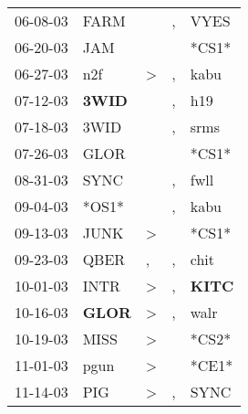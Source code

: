\begin{supertabular}{p{0.07\textwidth}p{0.06\textwidth}p{0.02\textwidth}p{0.02\textwidth}p{0.06\textwidth}}
          06-08-03\textsuperscript{} &           FARM\textsuperscript{} &                  &             , &           VYES\textsuperscript{} \\
          06-20-03\textsuperscript{} &            JAM\textsuperscript{} &                  &               &                            *CS1* \\
          06-27-03\textsuperscript{} &            n2f\textsuperscript{} &     \textgreater &             , &           kabu\textsuperscript{} \\
          07-12-03\textsuperscript{} &  \textbf{3WID\textsuperscript{}} &                  &             , &            h19\textsuperscript{} \\
          07-18-03\textsuperscript{} &           3WID\textsuperscript{} &                  &             , &           srms\textsuperscript{} \\
          07-26-03\textsuperscript{} &           GLOR\textsuperscript{} &                  &               &                            *CS1* \\
          08-31-03\textsuperscript{} &           SYNC\textsuperscript{} &                  &             , &           fwll\textsuperscript{} \\
          09-04-03\textsuperscript{} &                            *OS1* &                  &             , &           kabu\textsuperscript{} \\
          09-13-03\textsuperscript{} &           JUNK\textsuperscript{} &     \textgreater &               &                            *CS1* \\
          09-23-03\textsuperscript{} &           QBER\textsuperscript{} &                , &             , &           chit\textsuperscript{} \\
          10-01-03\textsuperscript{} &           INTR\textsuperscript{} &     \textgreater &             , &  \textbf{KITC\textsuperscript{}} \\
          10-16-03\textsuperscript{} &  \textbf{GLOR\textsuperscript{}} &     \textgreater &             , &           walr\textsuperscript{} \\
          10-19-03\textsuperscript{} &           MISS\textsuperscript{} &     \textgreater &               &                            *CS2* \\
          11-01-03\textsuperscript{} &           pgun\textsuperscript{} &     \textgreater &               &                            *CE1* \\
          11-14-03\textsuperscript{} &            PIG\textsuperscript{} &     \textgreater &             , &           SYNC\textsuperscript{} \\

\end{supertabular}
